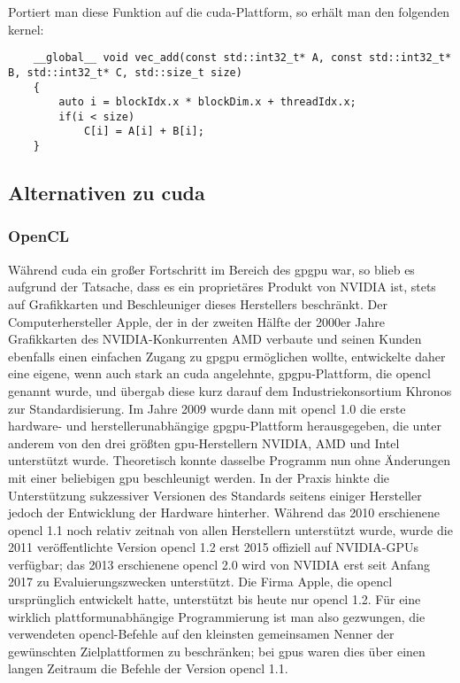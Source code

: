 Portiert man diese Funktion auf die \gls{cuda}-Plattform, so erhält man den folgenden \gls{kernel}:

\begin{verbatim}
    __global__ void vec_add(const std::int32_t* A, const std::int32_t* B, std::int32_t* C, std::size_t size)
    {
        auto i = blockIdx.x * blockDim.x + threadIdx.x;
        if(i < size)
            C[i] = A[i] + B[i];
    }
\end{verbatim}

\subsection{Alternativen zu \gls{cuda}}

\subsubsection{OpenCL{\texttrademark}}

Während \gls{cuda} ein großer Fortschritt im Bereich des \gls{gpgpu} war, so blieb es aufgrund der Tatsache, dass es
ein proprietäres Produkt von NVIDIA{\textregistered} ist, stets auf Grafikkarten und Beschleuniger dieses Herstellers
beschränkt. Der Computerhersteller Apple{\textregistered}, der in der zweiten Hälfte der 2000er Jahre Grafikkarten des
NVIDIA{\textregistered}-Konkurrenten AMD verbaute und seinen Kunden ebenfalls einen einfachen Zugang zu
\gls{gpgpu} ermöglichen wollte, entwickelte daher eine eigene, wenn auch stark an \gls{cuda} angelehnte,
\gls{gpgpu}-Plattform, die \gls{opencl} genannt wurde, und übergab diese kurz darauf dem Industriekonsortium Khronos zur
Standardisierung. Im Jahre 2009 wurde dann mit \gls{opencl} 1.0 die erste hardware- und herstellerunabhängige
\gls{gpgpu}-Plattform herausgegeben, die unter anderem von den drei größten \gls{gpu}-Herstellern
NVIDIA{\textregistered}, AMD und Intel{\textregistered} unterstützt wurde. Theoretisch konnte dasselbe Programm nun ohne
Änderungen mit einer beliebigen \gls{gpu} beschleunigt werden. In der Praxis hinkte die Unterstützung sukzessiver
Versionen des Standards seitens einiger Hersteller jedoch der Entwicklung der Hardware hinterher. Während das 2010
erschienene \gls{opencl} 1.1 noch relativ zeitnah von allen Herstellern unterstützt wurde, wurde die 2011
veröffentlichte Version \gls{opencl} 1.2 erst 2015 offiziell auf NVIDIA{\textregistered}-GPUs verfügbar; das 2013
erschienene \gls{opencl} 2.0 wird von NVIDIA{\textregistered} erst seit Anfang 2017 zu Evaluierungszwecken unterstützt.
Die Firma Apple{\textregistered}, die \gls{opencl} ursprünglich entwickelt hatte, unterstützt bis heute nur \gls{opencl}
1.2. Für eine wirklich plattformunabhängige Programmierung ist man also gezwungen, die verwendeten \gls{opencl}-Befehle
auf den kleinsten gemeinsamen Nenner der gewünschten Zielplattformen zu beschränken; bei \gls{gpu}s waren dies über
einen langen Zeitraum die Befehle der Version \gls{opencl} 1.1.

